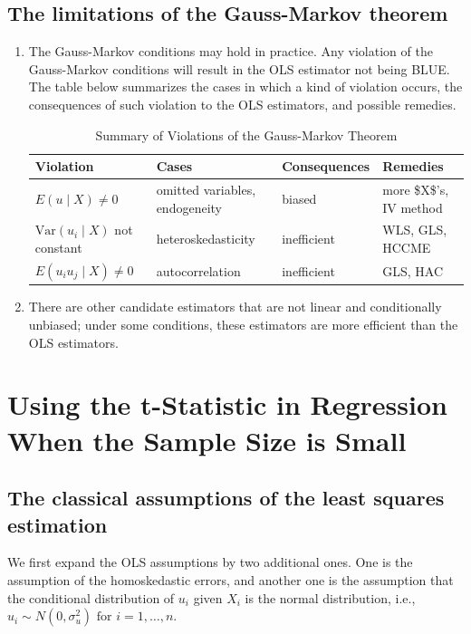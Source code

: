 \documentclass[a4paper,11pt]{article}
\newcommand{\var}{\mathrm{Var}}
\begin{document}
\subsection{The limitations of the Gauss-Markov theorem}
\label{sec:org520d753}
\begin{enumerate}
\item The Gauss-Markov conditions may hold in practice. Any violation of
the Gauss-Markov conditions will result in the OLS estimator not
being BLUE. The table below summarizes the cases in which a kind of
violation occurs, the consequences of such violation to the OLS
estimators, and possible remedies.

\begin{table}[htbp]
\caption{Summary of Violations of the Gauss-Markov Theorem}
\centering
\small
\begin{tabular}{p{4cm}|p{5.5cm}|p{2.5cm}|p{3.4cm}}
\toprule
Violation & Cases & Consequences & Remedies\\
\midrule
\(E(u \mid X) \neq 0\) & omitted variables, endogeneity & biased & more \$X\$'s, IV method\\
\(\var(u_i\mid X)\) not constant & heteroskedasticity & inefficient & WLS, GLS, HCCME\\
\(E(u_{i}u_{j}\mid X) \neq 0\) & autocorrelation & inefficient & GLS, HAC\\
\bottomrule
\end{tabular}
\end{table}

\item There are other candidate estimators that are not linear and
conditionally unbiased; under some conditions, these estimators are
more efficient than the OLS estimators.
\end{enumerate}

\section{Using the t-Statistic in Regression When the Sample Size is Small}
\label{sec:org0b6b9b7}
\subsection{The classical assumptions of the least squares estimation}
\label{sec:org923f997}
We first expand the OLS assumptions by two additional ones. One is the
assumption of the homoskedastic errors, and another one is the
assumption that the conditional distribution of \(u_i\) given \(X_i\) is
the normal distribution, i.e., \(u_i \sim N(0,
\sigma^2_u) \text{ for } i = 1, \ldots, n\). 
\end{document}
